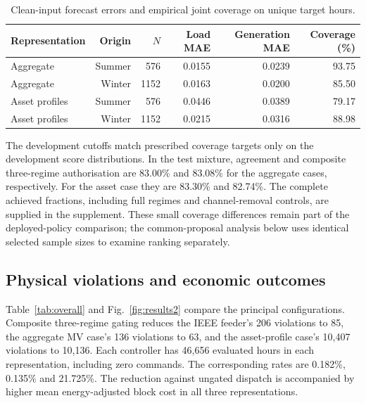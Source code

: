 \documentclass[preprint,12pt]{elsarticle}
\begin{document}
\begin{table}[tbp]
\centering\small\setlength{\tabcolsep}{3.5pt}
\caption{Clean-input forecast errors and empirical joint coverage on unique target hours.}\label{tab:forecast}
\begin{tabular}{lrrrrr}
\toprule
Representation & Origin & $N$ & Load MAE & Generation MAE & Coverage (\%)\\\midrule
Aggregate & Summer & 576 & 0.0155 & 0.0239 & 93.75\\
Aggregate & Winter & 1152 & 0.0163 & 0.0200 & 85.50\\
Asset profiles & Summer & 576 & 0.0446 & 0.0389 & 79.17\\
Asset profiles & Winter & 1152 & 0.0215 & 0.0316 & 88.98\\
\bottomrule\end{tabular}
\end{table}
The development cutoffs match prescribed coverage targets only on the development score distributions. In the test mixture, agreement and composite three-regime authorisation are 83.00\% and 83.08\% for the aggregate cases, respectively. For the asset case they are 83.30\% and 82.74\%. The complete achieved fractions, including full regimes and channel-removal controls, are supplied in the supplement. These small coverage differences remain part of the deployed-policy comparison; the common-proposal analysis below uses identical selected sample sizes to examine ranking separately.

\subsection{Physical violations and economic outcomes}
Table~\ref{tab:overall} and Fig.~\ref{fig:results2} compare the principal configurations. Composite three-regime gating reduces the IEEE feeder's 206 violations to 85, the aggregate MV case's 136 violations to 63, and the asset-profile case's 10,407 violations to 10,136. Each controller has 46,656 evaluated hours in each representation, including zero commands. The corresponding rates are 0.182\%, 0.135\% and 21.725\%. The reduction against ungated dispatch is accompanied by higher mean energy-adjusted block cost in all three representations.
\end{document}
